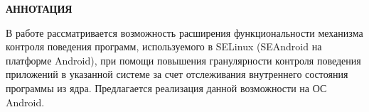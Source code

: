 \documentclass[russian,utf8,pointsubsection,emptystyle, 12pt]{eskdtext}
\begin{document}
\maketitle


\large{\textbf{АННОТАЦИЯ}}

В работе рассматривается возможность расширения функциональности
механизма контроля поведения программ, используемого в SELinux
(SEAndroid на платформе Android), при помощи повышения гранулярности
контроля поведения приложений в указанной системе за счет отслеживания
внутреннего состояния программы из ядра. Предлагается реализация данной
возможности на ОС Android.

\newpage

\tableofcontents
\newpage

%






% 
\end{document}
